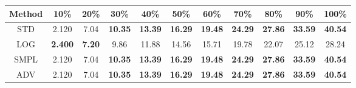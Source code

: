 \documentclass{standalone}
\begin{document}
\begin{tabular}{c|cccccccccc}
      \toprule
      Method & 10\% & 20\% & 30\% & 40\% & 50\% & 60\% & 70\% & 80\% & 90\% & 100\% \\
      \midrule
STD & 2.120 & 7.04 & \textbf{10.35} & \textbf{13.39} & \textbf{16.29} & \textbf{19.48} & \textbf{24.29} & \textbf{27.86} & \textbf{33.59} & \textbf{40.54}\\
LOG & \textbf{2.400} & \textbf{7.20} & 9.86 & 11.88 & 14.56 & 15.71 & 19.78 & 22.07 & 25.12 & 28.24\\
SMPL & 2.120 & 7.04 & \textbf{10.35} & \textbf{13.39} & \textbf{16.29} & \textbf{19.48} & \textbf{24.29} & \textbf{27.86} & \textbf{33.59} & \textbf{40.54}\\
ADV & 2.120 & 7.04 & \textbf{10.35} & \textbf{13.39} & \textbf{16.29} & \textbf{19.48} & \textbf{24.29} & \textbf{27.86} & \textbf{33.59} & \textbf{40.54}\\
  \bottomrule
\end{tabular}
\end{document}
